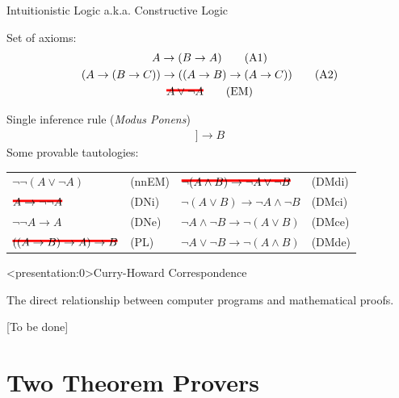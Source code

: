 \documentclass[aspectratio=169, fleqn]{beamer}
\newcommand\hcancel[2][black]{\setbox0=\hbox{$#2$}%
\rlap{\raisebox{.45\ht0}{\textcolor{#1}{\rule{\wd0}{2pt}}}}#2}
\begin{document}
\begin{frame}{Intuitionistic Logic}
{a.k.a. Constructive Logic}

\textcolor{dkblue}{Set of axioms:}
\begin{gather}
A \rightarrow (B \rightarrow A)
\tag{A1} \\
(A \rightarrow (B \rightarrow C)) \rightarrow ((A \rightarrow B) \rightarrow (A \rightarrow C))
\tag{A2} \\
\hcancel[red]{ A \lor \neg A }
\tag{EM} 
\end{gather}

\textcolor{dkblue}{Single inference rule (\textit{Modus Ponens})}
\begin{gather} 
[\![ A, A \rightarrow B ]\!] \longrightarrow B
\tag{MP}
\end{gather}
\textcolor{dkblue}{Some provable tautologies:}

\begin{tabular}{p{.32\linewidth}p{.2\linewidth} p{.3\linewidth}p{.25\linewidth}}
  $\neg \neg (A \lor \neg A)$ & (nnEM) & $\hcancel[red]{ \neg (A \land B) \rightarrow \neg A \lor \neg B }$ & (DMdi) \\
  $\hcancel[red]{ A \rightarrow \neg \neg A }$ & (DNi)  & $\neg (A \lor B) \rightarrow \neg A \land \neg B $ & (DMci) \\
  $\neg \neg A \rightarrow A$ & (DNe)  & $\neg A \land \neg B \rightarrow  \neg (A \lor B) $ & (DMce) \\
  $\hcancel[red]{ ((A \rightarrow B) \rightarrow A) \rightarrow B }$ & (PL) & $\neg A \lor \neg B \rightarrow  \neg (A \land B) $ & (DMde)
\end{tabular}

\end{frame}

\begin{frame}<presentation:0>{Curry-Howard Correspondence}

The direct relationship between computer programs and mathematical proofs.

[To be done]
\end{frame}


\section{Two Theorem Provers}
\end{document}
